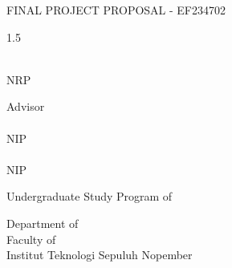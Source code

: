 \begin{large}
  FINAL PROJECT PROPOSAL - EF234702
\end{large}

\vspace{\fill}

\begin{spacing}{1.5}
  \begin{Large}
    \engtatitle{}
  \end{Large}
\end{spacing}

\vspace{\fill}

\begin{large}
  \name{} \\
  \textmd{NRP \nrp{}}
\end{large}

\vspace{\fill}

\begin{large}
  \textmd{Advisor} \\
  \advisor{} \\
  \textmd{NIP \advisornip{}} \\
  \coadvisor{} \\
  \textmd{NIP \coadvisornip{}}
\end{large}

\vspace{\fill}

Undergraduate Study Program of \engstudyprogram{} \\

\mdseries

Department of \engdepartment{} \\
Faculty of \engfaculty{} \\
Institut Teknologi Sepuluh Nopember

\place{} \\ \the\year{}

